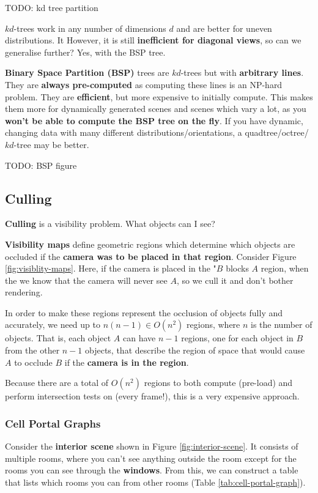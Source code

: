 \documentclass{article}
\begin{document}
TODO: kd tree partition

$kd$-trees work in any number of dimensions $d$ and are better for uneven distributions. It However, it is still \textbf{inefficient for diagonal views}, so can we generalise further? Yes, with the BSP tree.

\textbf{Binary Space Partition (BSP)} trees are $kd$-trees but with \textbf{arbitrary lines}. They are \textbf{always pre-computed} as computing these lines is an NP-hard problem. They are \textbf{efficient}, but more expensive to initially compute. This makes them more for dynamically generated scenes and scenes which vary a lot, as you \textbf{won't be able to compute the BSP tree on the fly}. If you have dynamic, changing data with many different distributions/orientations, a quadtree/octree/$kd$-tree may be better.

TODO: BSP figure

\subsection{Culling}

\textbf{Culling} is a visibility problem. What objects can I see? 

\textbf{Visibility maps} define geometric regions which determine which objects are occluded if the \textbf{camera was to be placed in that region}. Consider Figure \ref{fig:visiblity-maps}. Here, if the camera is placed in the "$B$ blocks $A$ region, when the we know that the camera will never see $A$, so we cull it and don't bother rendering.

In order to make these regions represent the occlusion of objects fully and accurately, we need up to $n(n-1) \in O(n^2)$ regions, where $n$ is the number of objects. That is, each object $A$ can have $n - 1$ regions, one for each object in $B$ from the other $n - 1$ objects, that describe the region of space that would cause $A$ to occlude $B$ if the \textbf{camera is in the region}.

Because there are a total of $O(n^2)$ regions to both compute (pre-load) and perform intersection tests on (every frame!), this is a very expensive approach.

\subsubsection{Cell Portal Graphs}

Consider the \textbf{interior scene} shown in Figure \ref{fig:interior-scene}. It consists of multiple rooms, where you can't see anything outside the room except for the rooms you can see through the \textbf{windows}. From this, we can construct a table that lists which rooms you can from other rooms (Table \ref{tab:cell-portal-graph}).
\end{document}
